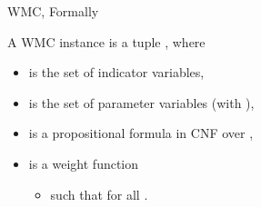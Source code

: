 \documentclass{beamer}
\begin{document}
\begin{frame}{WMC, Formally}
  \begin{definition}
    A \alert{WMC instance} is a tuple , where
    \begin{itemize}
    \item {} is the set of \alert{indicator variables},
    \item {} is the set of \alert{parameter variables} (with
      ),
    \item \structure{$\phi$} is a propositional formula in CNF over
      ,
    \item {} is a \alert{weight function}
      \begin{itemize}
      \item such that  for all .
      \end{itemize}
    \end{itemize}
  \end{definition}
\end{frame}

\end{document}
